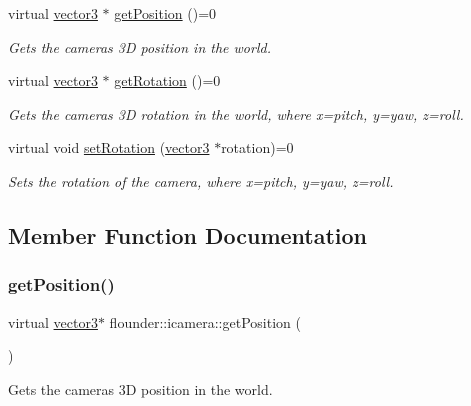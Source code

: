 \begin{DoxyCompactItemize}
virtual \hyperlink{classflounder_1_1vector3}{vector3} $\ast$ \hyperlink{classflounder_1_1icamera_a1b3e1ee504b631da4baa1454304729e7}{get\+Position} ()=0
\begin{DoxyCompactList}\small\item\em Gets the cameras 3D position in the world. \end{DoxyCompactList}\item 
virtual \hyperlink{classflounder_1_1vector3}{vector3} $\ast$ \hyperlink{classflounder_1_1icamera_aa4d73bdf412e90c6d8747fc075568ff1}{get\+Rotation} ()=0
\begin{DoxyCompactList}\small\item\em Gets the cameras 3D rotation in the world, where x=pitch, y=yaw, z=roll. \end{DoxyCompactList}\item 
virtual void \hyperlink{classflounder_1_1icamera_abe51adbcadd5533bb1cd074d05179cd4}{set\+Rotation} (\hyperlink{classflounder_1_1vector3}{vector3} $\ast$rotation)=0
\begin{DoxyCompactList}\small\item\em Sets the rotation of the camera, where x=pitch, y=yaw, z=roll. \end{DoxyCompactList}\end{DoxyCompactItemize}


\subsection{Member Function Documentation}
\mbox{\label{classflounder_1_1icamera_a1b3e1ee504b631da4baa1454304729e7}} 
\subsubsection{\texorpdfstring{get\+Position()}{getPosition()}}
{\footnotesize\ttfamily virtual \hyperlink{classflounder_1_1vector3}{vector3}$\ast$ flounder\+::icamera\+::get\+Position (\begin{DoxyParamCaption}{ }\end{DoxyParamCaption})\hspace{0.3cm}{\ttfamily [pure virtual]}}



Gets the cameras 3D position in the world. 

